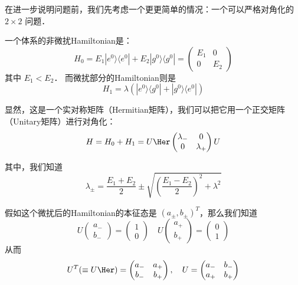 在进一步说明问题前，我们先考虑一个更更简单的情况：一个可以严格对角化的 $2\times2$ 问题．

\begin{exercise}{}
一个体系的非微扰Hamiltonian是：
\begin{equation}
H_0 = E_1|e^0\rangle\langle e^0| + E_2|g^0\rangle\langle g^0| =  \left(\begin{matrix} E_1 & 0\\ 0 & E_2\end{matrix}\right)
\end{equation}
其中 $E_1<E_2$． 而微扰部分的Hamiltonian则是
\begin{equation}
H_1 = \lambda(|e^0\rangle\langle g^0|+|g^0\rangle\langle e^0|)
\end{equation}

显然，这是一个实对称矩阵（Hermitian矩阵），我们可以把它用一个正交矩阵（Unitary矩阵）进行对角化：
\begin{equation}
H = H_0+H_1 = U\Her\left(\begin{matrix} \lambda_- & 0\\0 & \lambda_+\end{matrix}\right)U
\end{equation}

其中，我们知道
\begin{equation}
\lambda_{\pm} = \frac{E_1+E_2}{2} \pm \sqrt{\left( \frac{E_1-E_2}{2}\right)^2 + \lambda^2}
\end{equation}

假如这个微扰后的Hamiltonian的本征态是 $(a_\pm,b_\pm)^T$，那么我们知道
\begin{equation}
U\left(\begin{matrix}a_-\\b_-\end{matrix}\right) = \left(\begin{matrix}1\\0\end{matrix}\right)\quad U\left(\begin{matrix}a_+\\b_+\end{matrix}\right) = \left(\begin{matrix}0\\1\end{matrix}\right)
\end{equation}
从而
\begin{equation}
U^T(\equiv U\Her) = \left(\begin{matrix}a_- & a_+\\b_- & b_+\end{matrix}\right), \quad U = \left(\begin{matrix}a_- & b_-\\a_+ & b_+\end{matrix}\right)
\end{equation}


\end{exercise}
